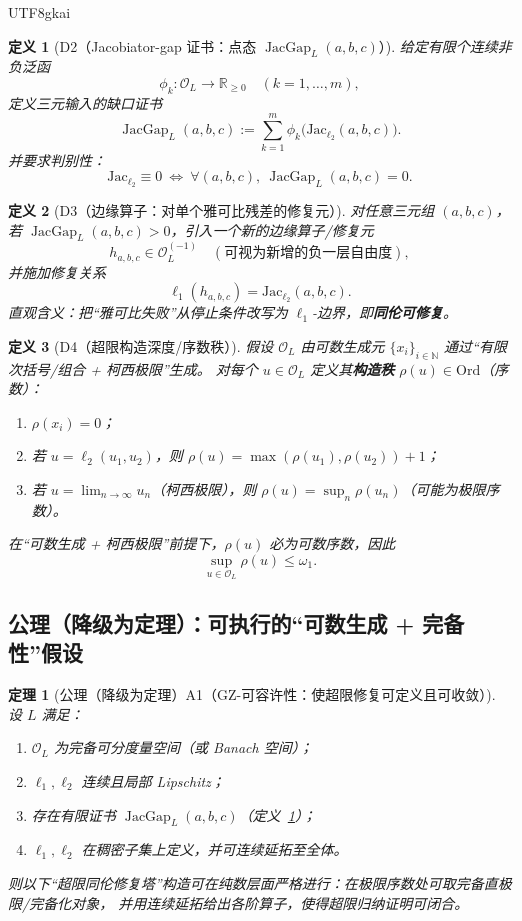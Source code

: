 \documentclass[12pt]{article}
\newtheorem{definition}{定义}[section]
\newtheorem{theorem}{定理}[section]
\newcommand{\RR}{\mathbb{R}}
\newcommand{\NN}{\mathbb{N}}
\newcommand{\JacGap}{\operatorname{JacGap}}
\begin{document}
\begin{CJK*}{UTF8}{gkai}
\begin{definition}[D2（Jacobiator-gap 证书：点态 $\JacGap_L(a,b,c)$）]
\label{def:tex27-ch25-d2}
给定有限个连续非负泛函
\[
  \phi_k:\mathcal{O}_L\to\RR_{\ge 0}
  \quad (k=1,\dots,m),
\]
定义三元输入的缺口证书
\[
  \JacGap_L(a,b,c)
  :=
  \sum_{k=1}^m \phi_k\bigl(\mathrm{Jac}_{\ell_2}(a,b,c)\bigr).
\]
并要求判别性：
\[
  \mathrm{Jac}_{\ell_2}\equiv 0
  \ \Longleftrightarrow\
  \forall(a,b,c),\ \JacGap_L(a,b,c)=0.
\]
\end{definition}

\begin{definition}[D3（边缘算子：对单个雅可比残差的修复元）]
\label{def:tex27-ch25-d3}
对任意三元组 $(a,b,c)$，若 $\JacGap_L(a,b,c)>0$，引入一个新的边缘算子/修复元
\[
  h_{a,b,c}\in \mathcal{O}_{L}^{(-1)}
  \quad(\text{可视为新增的负一层自由度}),
\]
并施加修复关系
\[
  \ell_1(h_{a,b,c})=\mathrm{Jac}_{\ell_2}(a,b,c).
\]
直观含义：把“雅可比失败”从停止条件改写为 $\ell_1$-边界，即\textbf{同伦可修复}。
\end{definition}

\begin{definition}[D4（超限构造深度/序数秩）]
\label{def:tex27-ch25-d4}
假设 $\mathcal{O}_L$ 由可数生成元 $\{x_i\}_{i\in\NN}$ 通过“有限次括号/组合 + 柯西极限”生成。
对每个 $u\in\mathcal{O}_L$ 定义其\textbf{构造秩} $\rho(u)\in\mathrm{Ord}$（序数）：
\begin{enumerate}
  \item $\rho(x_i)=0$；
  \item 若 $u=\ell_2(u_1,u_2)$，则 $\rho(u)=\max(\rho(u_1),\rho(u_2))+1$；
  \item 若 $u=\lim_{n\to\infty}u_n$（柯西极限），则 $\rho(u)=\sup_{n}\rho(u_n)$（可能为极限序数）。
\end{enumerate}
在“可数生成 + 柯西极限”前提下，$\rho(u)$ 必为可数序数，因此
\[
  \sup_{u\in\mathcal{O}_L}\rho(u)\le \omega_1.
\]
\end{definition}

\subsection{公理（降级为定理）：可执行的“可数生成 + 完备性”假设}
\label{subsec:tex27-ch25-axiom}

\begin{theorem}[公理（降级为定理）A1（GZ-可容许性：使超限修复可定义且可收敛）]
\label{thm:tex27-ch25-a1}
设 $L$ 满足：
\begin{enumerate}
  \item $\mathcal{O}_L$ 为完备可分度量空间（或 Banach 空间）；
  \item $\ell_1,\ell_2$ 连续且局部 Lipschitz；
  \item 存在有限证书 $\JacGap_L(a,b,c)$（定义~\ref{def:tex27-ch25-d2}）；
  \item $\ell_1,\ell_2$ 在稠密子集上定义，并可连续延拓至全体。
\end{enumerate}
则以下“超限同伦修复塔”构造可在纯数层面严格进行：在极限序数处可取完备直极限/完备化对象，
并用连续延拓给出各阶算子，使得超限归纳证明可闭合。
\end{theorem}


\end{CJK*}
\end{document}
